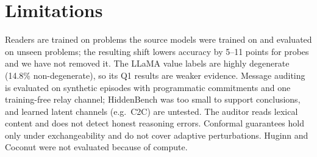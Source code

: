 \section{Limitations}
\label{sec:limits}
Readers are trained on problems the source models were trained on and evaluated on unseen problems; the resulting shift lowers accuracy by 5--11 points for probes and we have not removed it. The LLaMA value labels are highly degenerate (14.8\% non-degenerate), so its Q1 results are weaker evidence. Message auditing is evaluated on synthetic episodes with programmatic commitments and one training-free relay channel; HiddenBench was too small to support conclusions, and learned latent channels (e.g.\ C2C) are untested. The auditor reads lexical content and does not detect honest reasoning errors. Conformal guarantees hold only under exchangeability and do not cover adaptive perturbations. Huginn and Coconut were not evaluated because of compute.
